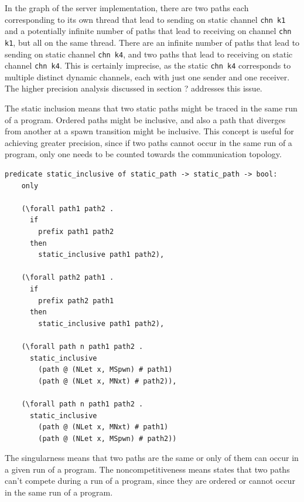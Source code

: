 \documentclass{article}
\begin{document}
In the graph of the server implementation, there are two paths each corresponding to its
own thread that lead
to sending on
static channel \lstinline[language=sugar_lang]{chn k1} and a potentially infinite number of
paths that lead to receiving on
channel \lstinline[language=sugar_lang]{chn k1}, but all on the same thread.
There are an infinite number of paths that lead
to sending on static channel \lstinline[language=sugar_lang]{chn k4}, and two paths
that lead to receiving on static channel
\lstinline[language=sugar_lang]{chn k4}. This is certainly imprecise,
as the static \lstinline[language=sugar_lang]{chn k4} corresponds to
multiple distinct dynamic channels, each with just one sender and one receiver.  The higher
precision analysis discussed in section ? addresses this issue.


The static inclusion means that two static paths might be traced in
the same run of a program. Ordered paths might be inclusive, and also a path that diverges
from another at a spawn transition might be inclusive. This concept is useful for achieving
greater precision, since if two paths cannot occur in the same run of a program, only one needs
to be counted towards the communication topology. 

\begin{lstlisting}[language=logic, mathescape]
  predicate static_inclusive of static_path -> static_path -> bool:
    only

    (\forall path1 path2 .
      if
        prefix path1 path2
      then
        static_inclusive path1 path2),

    (\forall path2 path1 .
      if
        prefix path2 path1
      then
        static_inclusive path1 path2),

    (\forall path n path1 path2 .
      static_inclusive
        (path @ (NLet x, MSpwn) # path1)
        (path @ (NLet x, MNxt) # path2)),

    (\forall path n path1 path2 .
      static_inclusive
        (path @ (NLet x, MNxt) # path1)
        (path @ (NLet x, MSpwn) # path2))
  \end{lstlisting}


The singularness means that two paths are the same or only of them can occur in a given run of
a program. The noncompetitiveness means states that two paths can't compete during a run of a
program, since they are ordered or cannot occur in the same run of a program.
\end{document}
